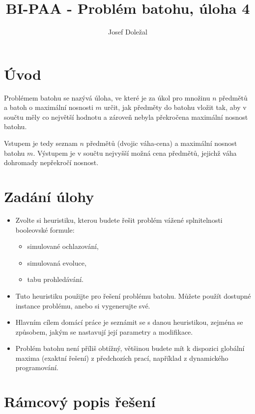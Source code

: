 \documentclass[czech]{article}
\title{BI-PAA - Problém batohu, úloha 4}
\author{Josef Doležal}
\begin{document}
\maketitle

\newpage

\section{Úvod}
Problémem batohu se nazývá úloha, ve které je za úkol pro množinu $n$ předmětů a batoh o maximální nosnosti $m$ určit, jak předměty do batohu vložit tak, aby v součtu měly co největší hodnotu a zároveň nebyla překročena maximální nosnost batohu.

Vstupem je tedy seznam $n$ předmětů (dvojic váha-cena) a maximální nosnost batohu $m$.
Výstupem je v součtu nejvyšší možná cena předmětů, jejichž váha dohromady nepřekročí nosnost.

\section{Zadání úlohy}

\begin{itemize}
    \item Zvolte si heuristiku, kterou budete řešit problém vážené splnitelnosti booleovské formule:
    \begin{itemize}
        \item simulované ochlazování,
        \item simulovaná evoluce,
        \item tabu prohledávání.
    \end{itemize}
    \item Tuto heuristiku použijte pro řešení problému batohu. Můžete použít dostupné instance problému, anebo si vygenerujte své.
    \item Hlavním cílem domácí práce je seznámit se s danou heuristikou, zejména se způsobem, jakým se nastavují její parametry a modifikace.
    \item Problém batohu není příliš obtížný, většinou budete mít k dispozici globální maxima (exaktní řešení) z předchozích prací, například z dynamického programování.
\end{itemize}

\section{Rámcový popis řešení}
\end{document}
